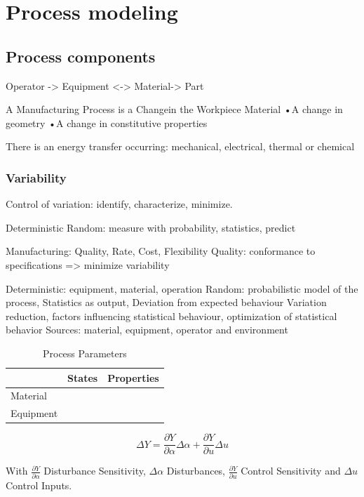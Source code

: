 \newpage
\section{Process modeling}
\subsection{Process components}
Operator -> Equipment <-> Material-> Part


A Manufacturing Process is a Changein the Workpiece Material
•A change in geometry
•A change in constitutive properties

There is an energy transfer occurring: mechanical, electrical, thermal or chemical 


\subsubsection{Variability}
Control of variation: identify, characterize, minimize.

Deterministic
Random: measure with probability, statistics, predict

Manufacturing: Quality, Rate, Cost, Flexibility
Quality: conformance to specifications => minimize variability

Deterministic: equipment, material, operation
Random: probabilistic model of the process, Statistics as output, Deviation from expected behaviour
Variation reduction, factors influencing statistical behaviour, optimization of statistical behavior
Sources: material, equipment, operator and environment

\begin{table}[!htb]
	\centering
    \def\arraystretch{1.5}
		\begin{tabular}{l l l}
	 \hline
      & States & Properties \\
	  \hline
		Material & & \\
		
		Equipment & & 
		\end{tabular}
	\caption{Process Parameters}
	\label{tab:bezeichnungen}
\end{table}

\begin{equation}
\Delta Y=\frac{\partial Y}{\partial \alpha}\Delta \alpha + \frac{\partial Y}{\partial u}\Delta u 
\end{equation}

With $\frac{\partial Y}{\partial \alpha}$ Disturbance Sensitivity, $\Delta \alpha$ Disturbances, $\frac{\partial Y}{\partial u}$ Control Sensitivity and $\Delta u$ Control Inputs.


